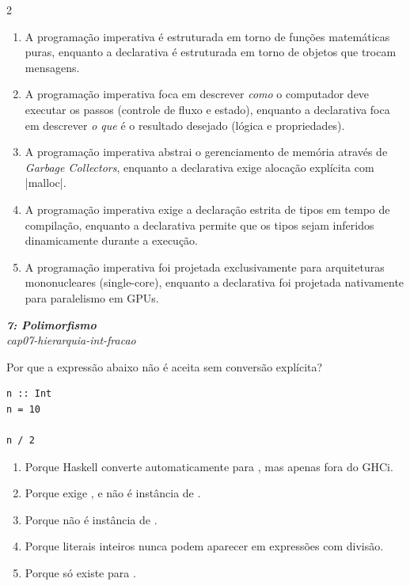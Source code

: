 \documentclass[a4paper,10pt,brazil]{article}
\begin{document}
\begin{multicols}{2}
\begin{enumerate}
  \item A programação imperativa é estruturada em torno de funções matemáticas puras, enquanto a declarativa é estruturada em torno de objetos que trocam mensagens.

  \item A programação imperativa foca em descrever \emph{como} o computador deve executar os passos (controle de fluxo e estado), enquanto a declarativa foca em descrever \emph{o que} é o resultado desejado (lógica e propriedades).

  \item A programação imperativa abstrai o gerenciamento de memória através de \emph{Garbage Collectors}, enquanto a declarativa exige alocação explícita com \cinline|malloc|.

  \item A programação imperativa exige a declaração estrita de tipos em tempo de compilação, enquanto a declarativa permite que os tipos sejam inferidos dinamicamente durante a execução.

  \item A programação imperativa foi projetada exclusivamente para arquiteturas mononucleares (single-core), enquanto a declarativa foi projetada nativamente para paralelismo em GPUs.


\end{enumerate}

\begin{flushright}
  \footnotesize
  \textit{\textbf{7: Polimorfismo}}\\
  \textit{cap07-hierarquia-int-fracao}\\

\end{flushright}
Por que a expressão abaixo não é aceita sem conversão explícita?

\begin{verbatim}
n :: Int
n = 10

n / 2
\end{verbatim}

\begin{enumerate}
  \item Porque Haskell converte automaticamente  para , mas apenas fora do GHCi.
  \item Porque \haskellinline{(/)} exige , e  não é instância de .
  \item Porque  não é instância de .
  \item Porque literais inteiros nunca podem aparecer em expressões com divisão.
  \item Porque \haskellinline{(/)} só existe para .


\end{enumerate}
\end{multicols}
\end{document}
